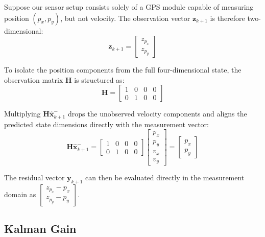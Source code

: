 \documentclass{article}
\begin{document}
	Suppose our sensor setup consists solely of a GPS module capable of measuring position $(p_x, p_y)$, but not velocity. The observation vector $\mathbf{z}_{k+1}$ is therefore two-dimensional:
	\begin{equation*}
		\mathbf{z}_{k+1} = 
		\begin{bmatrix} 
			z_{p_x} \\ z_{p_y} 
		\end{bmatrix}
	\end{equation*}
	
	To isolate the position components from the full four-dimensional state, the observation matrix $\mathbf{H}$ is structured as:
	\begin{equation*}
		\mathbf{H} = 
		\begin{bmatrix} 
			1 & 0 & 0 & 0 \\ 
			0 & 1 & 0 & 0 
		\end{bmatrix}
	\end{equation*}
	
	Multiplying $\mathbf{H} \hat{\mathbf{x}}_{k+1}^-$ drops the unobserved velocity components and aligns the predicted state dimensions directly with the measurement vector:
	\begin{equation*}
		\mathbf{H} \hat{\mathbf{x}}_{k+1}^- = 
		\begin{bmatrix} 
			1 & 0 & 0 & 0 \\ 
			0 & 1 & 0 & 0 
		\end{bmatrix}
		\begin{bmatrix} 
			p_x \\ p_y \\ v_x \\ v_y 
		\end{bmatrix}
		= 
		\begin{bmatrix} 
			p_x \\ p_y 
		\end{bmatrix}
	\end{equation*}
	
	The residual vector $\mathbf{y}_{k+1}$ can then be evaluated directly in the measurement domain as $\begin{bmatrix} z_{p_x} - p_x \\ z_{p_y} - p_y \end{bmatrix}$.
	
	
	\subsection{Kalman Gain}
	
\end{document}
